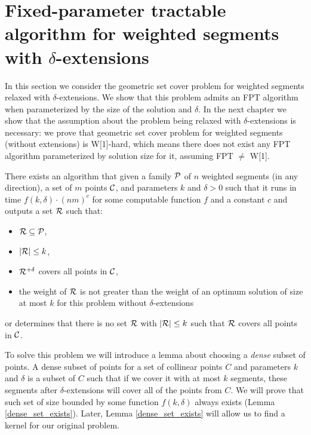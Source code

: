 \section{Fixed-parameter tractable algorithm for weighted segments with $\delta$-extensions}
\label{section:fpt_weighted}

In this section we consider the geometric set cover problem
for weighted segments relaxed with $\delta$-extensions.
We show that this problem
admits an FPT algorithm when parameterized by the size
of the solution and $\delta$.
In the next chapter we show that the assumption
about the problem being relaxed with $\delta$-extensions is necessary:
we prove that geometric set cover problem
for weighted segments (without extensions) is W[1]-hard, which means
there does not exist any FPT algorithm parameterized by solution size for it,
assuming FPT $\neq$ W[1].

\begin{tw}{
	\label{fpt_weighted_segment}
	There exists an algorithm that given a family $\mathcal{P}$ of
	$n$ weighted segments (in any direction),
	a set of $m$ points $\mathcal{C}$, and parameters $k$ and $\delta > 0$
	such that it
	runs in time $f(k, \delta) \cdot (nm)^c$ for some computable function $f$ and a constant $c$ and
	outputs a set $\mathcal{R}$ such that:
	\begin{itemize}
	\item $\mathcal{R} \subseteq \mathcal{P}$,
	\item $|\mathcal{R}| \le k$,
	\item $\mathcal{R}^{+\delta}$ covers all points in $\mathcal{C}$,
	\item the weight of $\mathcal{R}$ is not greater than the weight
	of an optimum solution of size at most $k$
	for this problem without $\delta$-extensions
	\end{itemize}
	or determines that there is no set $\mathcal{R}$ with $|\mathcal{R}| \le k$
	such that $\mathcal{R}$ covers all points in $\mathcal{C}$.
}\end{tw}


To solve this problem we will introduce a lemma about choosing
a \textit{dense} subset of points. A dense subset of points
for a set of collinear points $C$ and parameters $k$ and $\delta$
is a subset of $C$ such that
if we cover it with at most $k$ segments,
these segments after $\delta$-extensions will cover all of the points from $C$.
We will prove that such set 
of size bounded by some function $f(k, \delta)$
always exists (Lemma \ref{dense_set_exists}).
Later, Lemma \ref{dense_set_exists} will allow us to find a kernel
for our original problem.


